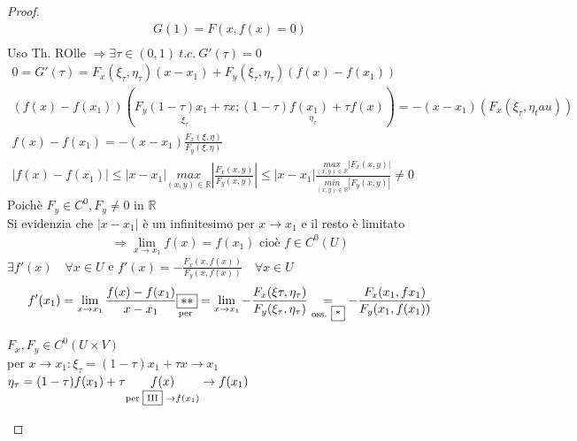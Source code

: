 \documentclass[a4paper, oneside]{article}
\begin{document}
\begin{proof}
\begin{gather*}
        G(1) = F(x,f(x) = 0)\\
    \end{gather*}
    Uso Th. ROlle $\Rightarrow \exists \tau \in (0,1) \ t.c. \ G'(\tau) = 0$\\
    \begin{gather*}
        0 = G'(\tau) = F_x(\xi_\tau, \eta_\tau)(x-x_1) + F_y(\xi_\tau,\eta_\tau)(f(x)-f(x_1))\\
        (f(x)-f(x_1)) (\underset{\xi_\tau}{F_y(1-\tau)x_1 + \tau x}; \underset{\eta_\tau}{(1-\tau)f(x_1)+\tau f(x)} ) = -(x-x_1)(F_x(\xi_\tau,\eta_tau))\\
        f(x) -f(x_1) = -(x-x_1)\frac{F_x(\xi, \eta)}{F_y(\xi, \eta)}\\
        \left\lvert f(x)-f(x_1) \right\rvert \leq \left\lvert x-x_1 \right\rvert \underset{(x,y) \in \mathbb{R}}{max}\left\lvert \frac{F_x(x,y)}{F_y(x,y)}\right\rvert  \leq \left\lvert x-x_1 \right\rvert \frac{\underset{(x,y) \in \mathbb{R}}{max} \left\lvert F_x(x,y) \right\rvert }{\underset{(x,y) \in \mathbb{R}}{min} \left\lvert F_y(x,y) \right\rvert } \neq 0
    \end{gather*}
    Poichè $F_y \in C^0, F_y \neq 0 $ in $\mathbb{R}$\\
    Si evidenzia che $\left\lvert x-x_1\right\rvert $ è un infinitesimo per $x\to x_1$ e il resto è limitato
    \begin{gather*}
        \Rightarrow \lim_{x \to x_1} f(x) = f(x_1) \text{ cioè } f \in C^0(U)
    \end{gather*}
     $\exists f'(x) \quad \forall x \in U$ e $f'(x) = -\frac{F_x(x,f(x))}{F_y(x,f(x))} \quad \forall x \in U$\\
    \begin{gather*}
        f'(x_1) = \lim_{x \to x_1} \frac{f(x)-f(x_1)}{x-x_1} \underset{\text{per }}{\boxed{**}} = \lim_{x \to x_1} -\frac{F_x(\xi\tau,\eta_\tau)}{F_y(\xi_\tau,\eta_\tau)} \underset{\text{oss. \fbox{*}}}{=} -\frac{F_x(x_1,fx_1)}{F_y(x_1,f(x_1))}
    \end{gather*}
    \begin{observation}
        \fbox{*} $F_x,F_y \in C^0(U \times V)$\\
        per $x \to x_1: \xi_\tau = (1-\tau) x_1+\tau x \to x_1$\\
        $\eta_\tau = (1-\tau)f(x_1) + \tau \underset{\text{per \fbox{III} }\to f(x_1)}{f(x)} \to f(x_1)$
    \end{observation}


\end{proof}
\end{document}
